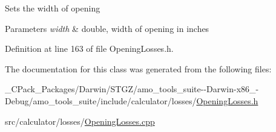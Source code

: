 Sets the width of opening 
\begin{DoxyParams}{Parameters}
{\em width} & double, width of opening in inches \\
\hline
\end{DoxyParams}


Definition at line 163 of file Opening\+Losses.\+h.



The documentation for this class was generated from the following files\+:\begin{DoxyCompactItemize}
\item 
\+\_\+\+C\+Pack\+\_\+\+Packages/\+Darwin/\+S\+T\+G\+Z/amo\+\_\+tools\+\_\+suite-\/-\/\+Darwin-\/x86\+\_-\/\+Debug/amo\+\_\+tools\+\_\+suite/include/calculator/losses/\hyperlink{___c_pack___packages_2_darwin_2_s_t_g_z_2amo__tools__suite--_darwin-x86__64-_debug_2amo__tools__9d4a9f8af5343886f55cd7f2000b8c2c}{Opening\+Losses.\+h}\item 
src/calculator/losses/\hyperlink{_opening_losses_8cpp}{Opening\+Losses.\+cpp}\end{DoxyCompactItemize}
